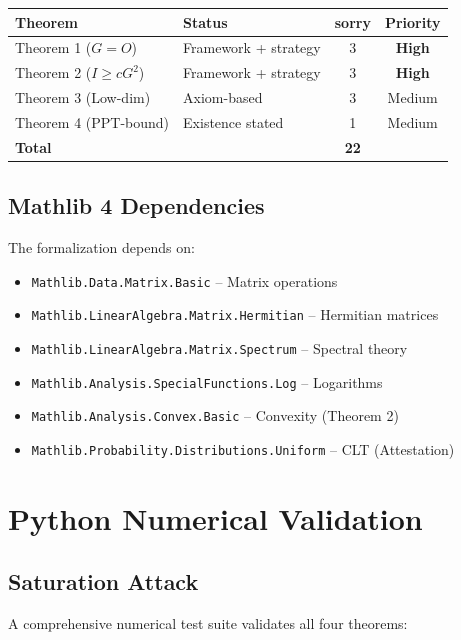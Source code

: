 \documentclass[11pt,a4paper]{article}
\theoremstyle{definition}
\begin{document}
\begin{table}[h]
\centering
\begin{tabular}{llcc}
\toprule
\textbf{Theorem} & \textbf{Status} & \textbf{sorry} & \textbf{Priority} \\
\midrule
Theorem 1 ($G = O$) & Framework + strategy & 3 & \textbf{High} \\
Theorem 2 ($I \geq cG^2$) & Framework + strategy & 3 & \textbf{High} \\
Theorem 3 (Low-dim) & Axiom-based & 3 & Medium \\
Theorem 4 (PPT-bound) & Existence stated & 1 & Medium \\
\midrule
\textbf{Total} & & \textbf{22} & \\
\bottomrule
\end{tabular}
\end{table}

\subsection{Mathlib 4 Dependencies}

The formalization depends on:
\begin{itemize}
    \item \texttt{Mathlib.Data.Matrix.Basic} -- Matrix operations
    \item \texttt{Mathlib.LinearAlgebra.Matrix.Hermitian} -- Hermitian matrices
    \item \texttt{Mathlib.LinearAlgebra.Matrix.Spectrum} -- Spectral theory
    \item \texttt{Mathlib.Analysis.SpecialFunctions.Log} -- Logarithms
    \item \texttt{Mathlib.Analysis.Convex.Basic} -- Convexity (Theorem 2)
    \item \texttt{Mathlib.Probability.Distributions.Uniform} -- CLT (Attestation)
\end{itemize}

\section{Python Numerical Validation}

\subsection{Saturation Attack}

A comprehensive numerical test suite validates all four theorems:
\end{document}
